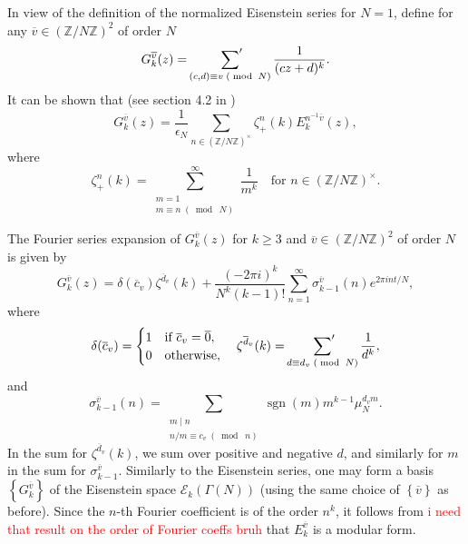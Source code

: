 \documentclass[10pt,leqno,twoside]{article}
\theoremstyle{plain}
\theoremstyle{definition}
\numberwithin{equation}{section}
\numberwithin{lem}{section}
\newcommand{\cbr}[1]{\left\{#1\right\}}
\newcommand{\smod}[1]{\;(\bmod\; #1)}
\DeclareMathOperator{\sgn}{sgn}
\newcommand{\sai}[1]{\textcolor{red}{#1}}
\begin{document}
In view of the definition of the normalized Eisenstein series for $N = 1$, define for any $\overline v\in (\mathbb Z/N\mathbb Z)^2$ of order $N$
\[G_k^{\overline v}(z) = \sideset{}{^\prime}\sum_{(c,d)\equiv v\smod N}\frac{1}{(cz+d)^k}.\] It can be shown that (see section 4.2 in \cite{diamond})
\[G_k^{\overline v}(z) = \frac{1}{\epsilon_N}\sum_{n\in(\mathbb Z/N\mathbb Z)^\times}\zeta_+^n(k)E_k^{n^{-1}\overline v}(z),\] where \[\zeta_+^n(k) = \sum_{\substack{m=1\\m\equiv n\smod N}}^\infty \frac{1}{m^k}\quad \text{for $n\in (\mathbb Z/N\mathbb Z)^\times$}.\] 

The Fourier series expansion of $G_k^{\overline v}(z)$ for $k\geq 3$ and $\overline v\in (\mathbb Z/N\mathbb Z)^2$ of order $N$ is given by \[G_k^{\overline v}(z) = \delta(\overline c_v)\zeta^{\overline d_v}(k) + \frac{(-2\pi i)^k}{N^k(k-1)!}\sum_{n=1}^\infty \sigma_{k-1}^{\overline v}(n)e^{2\pi i n t/N},\] where \[\delta(\overline c_v) = \begin{cases}
    1 & \text{if $\overline c_v =\overline 0$},\\
    0 & \text{otherwise},
\end{cases}\quad \zeta^{\overline d_v}(k) = \sideset{}{^\prime}\sum_{d\equiv d_v\smod N}\frac{1}{d^k},\] and 
\[\sigma_{k-1}^{\overline v}(n) = \sum_{\substack{m\mid n\\n/m \equiv c_v\smod n}}\sgn(m)m^{k-1}\mu_N^{d_vm}.\] In the sum for $\zeta^{\overline d_v}(k)$, we sum over positive and negative $d$, and similarly for $m$ in the sum for $\sigma_{k-1}^{\overline v}$. Similarly to the Eisenstein series, one may form a basis $\cbr{G_k^{\overline v}}$ of the Eisenstein space $\mathcal E_k(\varGamma(N))$ (using the same choice of $\cbr{\overline v}$ as before). Since the $n$-th Fourier coefficient is of the order $n^k$, it follows from \sai{i need that result on the order of Fourier coeffs bruh} that $E_k^{\overline v}$ is a modular form.
\end{document}
